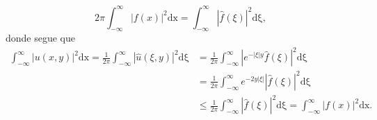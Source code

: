 \documentclass[../pde_notes.tex]{subfiles}
\begin{document}
\[
	2\pi \int_{-\infty}^{\infty}|f(x)|^{2} \mathrm{dx} = \int_{-\infty}^{\infty}|\hat{f}(\xi )|^{2} \mathrm{d\xi },
\]
donde segue que
\begin{align*}
	\int_{-\infty}^{\infty}|u(x, y)|^{2} \mathrm{dx} = \frac{1}{2\pi }\int_{-\infty}^{\infty}|\hat{u}(\xi , y)|^{2} \mathrm{d\xi } & = \frac{1}{2\pi }\int_{-\infty}^{\infty}|e^{-|\xi |y}\hat{f}(\xi )|^{2} \mathrm{d\xi }                                         \\
	                                                                                                                               & = \frac{1}{2\pi }\int_{-\infty}^{\infty}e^{-2y|\xi |} |\hat{f}(\xi )|^{2} \mathrm{d\xi }                                       \\
	                                                                                                                               & \leq \frac{1}{2\pi }\int_{-\infty}^{\infty}|\hat{f}(\xi )|^{2} \mathrm{d\xi } = \int_{-\infty}^{\infty}|f(x)|^{2} \mathrm{dx}.
\end{align*}
\end{document}
